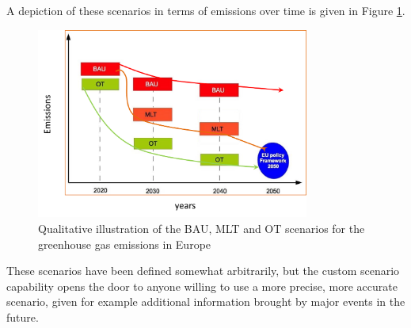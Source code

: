A depiction of these scenarios in terms of emissions over time is given in Figure \ref{fig:medeas-scenarios}.

\begin{figure}[h]
    \centering
    \includegraphics[width=0.8\textwidth]{resources/images/medeas-scenarios.png}
    \caption{Qualitative illustration of the BAU, MLT and OT scenarios for the greenhouse gas emissions in Europe}
    \label{fig:medeas-scenarios}
\end{figure}

These scenarios have been defined somewhat arbitrarily, but the custom scenario capability opens the door to anyone willing to use a more precise, more accurate scenario, given for example additional information brought by major events in the future.